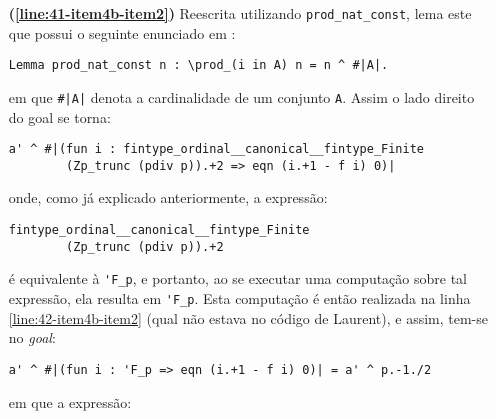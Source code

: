 \begin{enumerate}[label=\textbf{\roman*.}]
\begin{enumerate}[label=\textbf{\roman{enumi}.(\alph*)}]
\begin{enumerate}[label=\textbf{(\alph{enumii}.\arabic*)}]
\begin{enumerate}[listparindent=\parindent]
                                \item[\textbf{(\ref{line:41-item4b-item2})}] Reescrita utilizando \lstinline[language=coq]|prod_nat_const|, lema este que possui o seguinte enunciado em \cite{mathcomp-bigop}:
                                
                                        \begin{lstlisting}[language=coq,frame=single,tabsize=1]
Lemma prod_nat_const n : \prod_(i in A) n = n ^ #|A|.
                                        \end{lstlisting}
                                em que \lstinline[language=coq]!#|A|! denota a cardinalidade de um conjunto \lstinline[language=coq]!A!. Assim o lado direito do goal se torna:

                                        \begin{lstlisting}[language=coq,frame=single,tabsize=1]
a' ^ #|(fun i : fintype_ordinal__canonical__fintype_Finite 
        (Zp_trunc (pdiv p)).+2 => eqn (i.+1 - f i) 0)|
                                        \end{lstlisting}
                                onde, como já explicado anteriormente, a expressão:

                                        \begin{lstlisting}[language=coq,frame=single,tabsize=1]
fintype_ordinal__canonical__fintype_Finite 
        (Zp_trunc (pdiv p)).+2
                                        \end{lstlisting}
                                é equivalente à \lstinline[language=coq]|'F_p|, e portanto, ao se executar uma computação sobre tal expressão, ela resulta em \lstinline[language=coq]|'F_p|. Esta computação é então realizada na linha \ref{line:42-item4b-item2} (qual não estava no código de Laurent), e assim, tem-se no \textit{goal}:

                                        \begin{lstlisting}[language=coq,frame=single,tabsize=1]
a' ^ #|(fun i : 'F_p => eqn (i.+1 - f i) 0)| = a' ^ p.-1./2
                                        \end{lstlisting}
                                em que a expressão: 
                                

\end{enumerate}
\end{enumerate}
\end{enumerate}
\end{enumerate}
